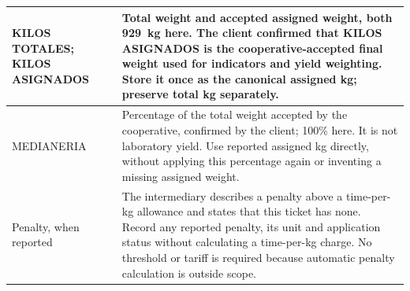 {\begin{longtable}{L{0.28}L{0.72}}
KILOS TOTALES; KILOS ASIGNADOS & Total weight and accepted assigned weight, both 929~kg here. The client confirmed that KILOS ASIGNADOS is the cooperative-accepted final weight used for indicators and yield weighting. Store it once as the canonical assigned kg; preserve total kg separately.\\\midrule
MEDIANERIA & Percentage of the total weight accepted by the cooperative, confirmed by the client; 100\% here. It is not laboratory yield. Use reported assigned kg directly, without applying this percentage again or inventing a missing assigned weight.\\\midrule
Penalty, when reported & The intermediary describes a penalty above a time-per-kg allowance and states that this ticket has none. Record any reported penalty, its unit and application status without calculating a time-per-kg charge. No threshold or tariff is required because automatic penalty calculation is outside scope.\\
\end{longtable}}

